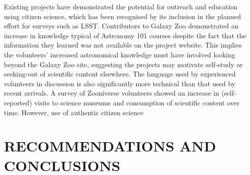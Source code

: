 \documentclass{pasa}
\begin{document}
Existing projects have demonstrated the potential for outreach and education using citizen science, which has been recognised by its inclusion in the planned effort for surveys such as LSST. Contributors to Galaxy Zoo demonstrated an increase in knowledge typical of Astronomy 101 courses despite the fact that the information they learned was not available on the project website. This implies the volunteers' increased astronomical knowledge must have involved looking beyond the Galaxy Zoo site, suggesting the projects may motivate self-study or seeking-out of scientific content elsewhere. The language used by experienced volunteers in discussion is also significantly more technical than that used by recent arrivals. A survey of Zooniverse volunteers showed an increase in (self-reported) visits to science museums and consumption of scientific content over time. However, use of authentic citizen science 



\section{RECOMMENDATIONS AND CONCLUSIONS}
\label{sec:conclusions}
\end{document}
